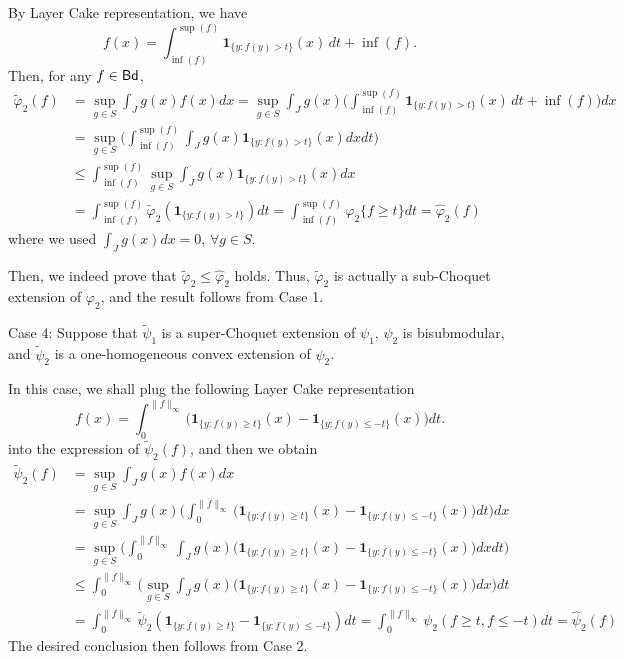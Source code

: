 \documentclass[12pt,a4paper]{article}
\begin{document}
By Layer Cake representation, we have 
\begin{equation}
f(x) = \int_{\inf (f)}^{\sup(f)} \mathbf{1}_{\{y: f(y) > t\}}(x) \, dt+\inf(f).
\label{eq:LCR-pointwise}
\end{equation}
Then, for any $f\in{\sf Bd}$, %
\begin{align*}
\widetilde{\varphi}_2(f)&=\sup_{g\in S}\int_J g(x)f(x)dx  =\sup_{g\in S}\int_J g(x)\Big(\int_{\inf (f)}^{\sup(f)} \mathbf{1}_{\{y: f(y) > t\}}(x) \, dt+\inf(f)\Big)dx 
\\&=\sup_{g\in S}\Big(\int_{\inf (f)}^{\sup(f)} \int_J g(x)\mathbf{1}_{\{y: f(y) > t\}}(x)dx  dt\Big) 
\\&\le \int_{\inf (f)}^{\sup(f)}\sup_{g\in S} \int_J g(x)\mathbf{1}_{\{y: f(y) > t\}}(x)dx
\\&=\int_{\inf (f)}^{\sup(f)} \widetilde{\varphi}_2(\mathbf{1}_{\{y: f(y) > t\}}) dt=\int_{\inf (f)}^{\sup(f)} \varphi_2\{f \ge t\} dt= \widehat{\varphi}_2(f)
\end{align*}
where we used $\int_J g(x) dx=0$, $\forall g\in S$.

Then, we indeed prove that  $\widetilde{\varphi}_2\le \widehat{\varphi}_2$ holds. 
Thus, %
$\widetilde{\varphi}_2$ is actually a sub-Choquet extension of $\varphi_2$, and the result follows from Case 1. 

\vspace{0.2cm}

\noindent Case 4: Suppose that  $\widetilde{\psi}_1$ is a super-Choquet extension  of $\psi_1$, $\psi_2$ is bisubmodular, and $\widetilde{\psi}_2$ is a one-homogeneous convex extension of $\psi_2$. 

In this case, we shall plug the following Layer Cake representation
\begin{equation}
f(x) = \int_{0}^{\|f\|_\infty} \big(\mathbf{1}_{\{y: f(y) \ge t\}}(x)  - \mathbf{1}_{\{y: f(y) \le- t\}}(x)\big)  dt.
\label{eq:LCR-pointwise-pair}
\end{equation}
into the expression of $\widetilde{\psi}_2(f)$, and then we obtain
\begin{align*}
\widetilde{\psi}_2(f)&=\sup_{g\in S}\int_J g(x)f(x)dx  \\&=\sup_{g\in S}\int_J g(x)\Big(\int_{0}^{\|f\|_\infty} \big(\mathbf{1}_{\{y: f(y) \ge t\}}(x)  - \mathbf{1}_{\{y: f(y) \le- t\}}(x)\big)  dt\Big)dx 
\\&=\sup_{g\in S}\Big(\int_{0}^{\|f\|_\infty} \int_J g(x)\big(\mathbf{1}_{\{y: f(y) \ge t\}}(x)  - \mathbf{1}_{\{y: f(y) \le- t\}}(x)\big)dx  dt\Big) 
\\&\le \int_{0}^{\|f\|_\infty} \Big(\sup_{g\in S}\int_J g(x)\big(\mathbf{1}_{\{y: f(y) \ge t\}}(x)  - \mathbf{1}_{\{y: f(y) \le- t\}}(x)\big)dx \Big) dt 
\\&=\int_{0}^{\|f\|_\infty} \widetilde{\psi}_2(\mathbf{1}_{\{y: f(y) \ge t\}}-\mathbf{1}_{\{y: f(y) \le- t\}}) dt=\int_{0}^{\|f\|_\infty} \psi_2(f \ge t,f \le- t) dt= \widehat{\psi}_2(f)
\end{align*}
The desired conclusion then follows from Case 2.
\end{document}
